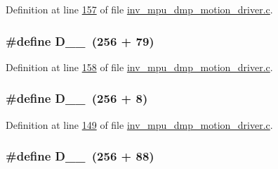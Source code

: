 Definition at line \hyperlink{inv__mpu__dmp__motion__driver_8c_source_l00157}{157} of file \hyperlink{inv__mpu__dmp__motion__driver_8c_source}{inv\+\_\+mpu\+\_\+dmp\+\_\+motion\+\_\+driver.\+c}.

\subsubsection[{\texorpdfstring{D\+\_\+1\+\_\+79}{D_1_79}}]{\setlength{\rightskip}{0pt plus 5cm}\#define D\+\_\+\_~(256 + 79)}\hypertarget{group___d_r_i_v_e_r_s_gae6ba99808ab9bc8eaddbc7c7cc6af1f3}{}\label{group___d_r_i_v_e_r_s_gae6ba99808ab9bc8eaddbc7c7cc6af1f3}


Definition at line \hyperlink{inv__mpu__dmp__motion__driver_8c_source_l00158}{158} of file \hyperlink{inv__mpu__dmp__motion__driver_8c_source}{inv\+\_\+mpu\+\_\+dmp\+\_\+motion\+\_\+driver.\+c}.

\subsubsection[{\texorpdfstring{D\+\_\+1\+\_\+8}{D_1_8}}]{\setlength{\rightskip}{0pt plus 5cm}\#define D\+\_\+\_~(256 + 8)}\hypertarget{group___d_r_i_v_e_r_s_ga2f44fbe8696fcc34619d6e61916c22d0}{}\label{group___d_r_i_v_e_r_s_ga2f44fbe8696fcc34619d6e61916c22d0}


Definition at line \hyperlink{inv__mpu__dmp__motion__driver_8c_source_l00149}{149} of file \hyperlink{inv__mpu__dmp__motion__driver_8c_source}{inv\+\_\+mpu\+\_\+dmp\+\_\+motion\+\_\+driver.\+c}.

\subsubsection[{\texorpdfstring{D\+\_\+1\+\_\+88}{D_1_88}}]{\setlength{\rightskip}{0pt plus 5cm}\#define D\+\_\+\_~(256 + 88)}\hypertarget{group___d_r_i_v_e_r_s_ga05bc14cf9653fc7778acfa75c9ac19df}{}\label{group___d_r_i_v_e_r_s_ga05bc14cf9653fc7778acfa75c9ac19df}


